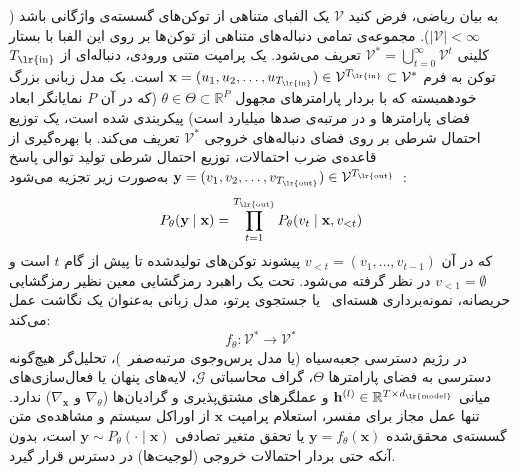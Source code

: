 به بیان ریاضی، فرض کنید $\mathcal{V}$ یک الفبای متناهی از توکن‌های گسسته‌ی واژگانی باشد ($|\mathcal{V}| < \infty$). مجموعه‌ی تمامی دنباله‌های متناهی از توکن‌ها بر روی این الفبا با بستار کلینی $\mathcal{V}^* = \bigcup_{t=0}^\infty \mathcal{V}^t$ تعریف می‌شود. یک پرامپت متنی ورودی، دنباله‌ای از $T_{\text{\lr{in}}}$ توکن به فرم $\mathbf{x} = (u_1, u_2, \dots, u_{T_{\text{\lr{in}}}}) \in \mathcal{V}^{T_{\text{\lr{in}}}} \subset \mathcal{V}^*$ است. یک مدل زبانی بزرگ خودهمبسته که با بردار پارامترهای مجهول $\theta \in \Theta \subset \mathbb{R}^P$ (که در آن $P$ نمایانگر ابعاد فضای پارامترها و در مرتبه‌ی صدها میلیارد است) پیکربندی شده است، یک توزیع احتمال شرطی بر روی فضای دنباله‌های خروجی $\mathcal{V}^*$ تعریف می‌کند. با بهره‌گیری از قاعده‌ی ضرب احتمالات، توزیع احتمال شرطی تولید توالی پاسخ $\mathbf{y} = (v_1, v_2, \dots, v_{T_{\text{\lr{out}}}}) \in \mathcal{V}^{T_{\text{\lr{out}}}}$ به‌صورت زیر تجزیه می‌شود~\cite{vaswani2017attention, brown2020language}:
\begin{equation}\label{eq:chap1_autoregressive_prob}
    P_\theta(\mathbf{y} \mid \mathbf{x}) = \prod_{t=1}^{T_{\text{\lr{out}}}} P_\theta(v_t \mid \mathbf{x}, v_{<t})
\end{equation}
که در آن $v_{<t} = (v_1, \dots, v_{t-1})$ پیشوند توکن‌های تولیدشده تا پیش از گام $t$ است و $v_{<1} = \emptyset$ در نظر گرفته می‌شود. تحت یک راهبرد رمزگشایی معین نظیر رمزگشایی حریصانه، نمونه‌برداری هسته‌ای~\cite{holtzman2020curious} یا جستجوی پرتو، مدل زبانی به‌عنوان یک نگاشت عمل می‌کند:
\begin{equation}\label{eq:chap1_generative_map}
    f_\theta: \mathcal{V}^* \to \mathcal{V}^*
\end{equation}
در رژیم دسترسی جعبه‌سیاه (یا مدل پرس‌وجوی مرتبه‌صفر~\cite{nesterov2017random})، تحلیل‌گر هیچ‌گونه دسترسی به فضای پارامترها $\Theta$، گراف محاسباتی $\mathcal{G}$، لایه‌های پنهان یا فعال‌سازی‌های میانی $\mathbf{h}^{(l)} \in \mathbb{R}^{T \times d_{\text{\lr{model}}}}$ و عملگرهای مشتق‌پذیری و گرادیان‌ها ($\nabla_\theta$ و $\nabla_{\mathbf{x}}$) ندارد. تنها عمل مجاز برای مفسر، استعلام پرامپت $\mathbf{x}$ از اوراکل سیستم و مشاهده‌ی متن گسسته‌ی محقق‌شده $\mathbf{y} = f_\theta(\mathbf{x})$ یا تحقق متغیر تصادفی $\mathbf{y} \sim P_\theta(\cdot \mid \mathbf{x})$ است، بدون آنکه حتی بردار احتمالات خروجی (لوجیت‌ها) در دسترس قرار گیرد.

